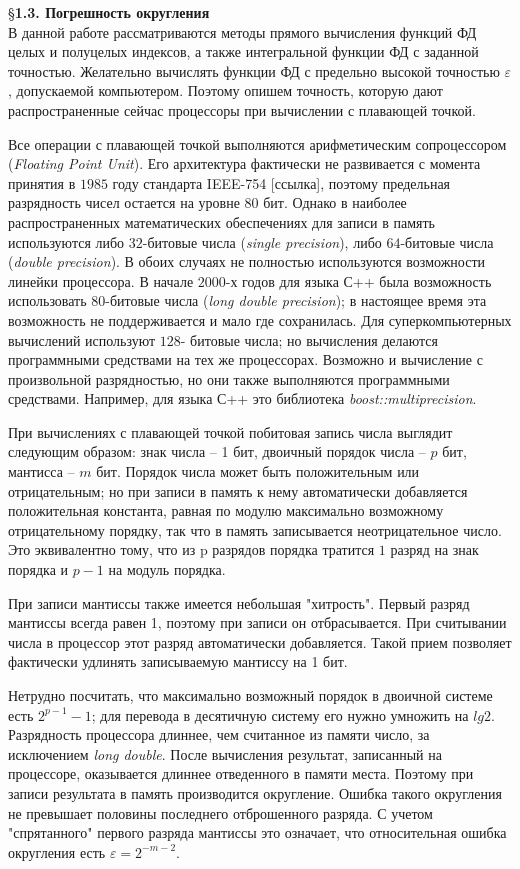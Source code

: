 \S \textbf{1.3. Погрешность округления}
\\

В данной работе рассматриваются методы прямого вычисления функций
ФД целых и полуцелых индексов, а также интегральной функции ФД с
заданной точностью. Желательно вычислять функции ФД с предельно высокой
точностью $\varepsilon$, допускаемой компьютером. Поэтому опишем точность, которую
дают распространенные сейчас процессоры при вычислении с плавающей
точкой.

Все операции с плавающей точкой
выполняются арифметическим сопроцессором (\textit{Floating Point Unit}). Его
архитектура фактически не развивается с момента принятия в $1985$ году
стандарта IEEE-754 [ссылка], поэтому предельная разрядность чисел остается на
уровне $80$ бит. Однако в наиболее распространенных математических
обеспечениях для записи в память используются либо $32$-битовые числа (\textit{single
precision}), либо $64$-битовые числа (\textit{double precision}). В обоих случаях не
полностью используются возможности линейки процессора. В начале $2000$-х
годов для языка С++ была возможность использовать $80$-битовые числа (\textit{long
double precision}); в настоящее время эта возможность не поддерживается и мало
где сохранилась. Для суперкомпьютерных вычислений используют $128$-
битовые числа; но вычисления делаются программными средствами на тех же
процессорах. Возможно и вычисление с произвольной разрядностью, но они
также выполняются программными средствами. Например, для языка С++ это
библиотека \textit{boost::multiprecision}.

При вычислениях с плавающей точкой побитовая запись числа выглядит
следующим образом: знак числа – 1 бит, двоичный порядок числа – $p$ бит,
мантисса – $m$ бит. Порядок числа может быть положительным или
отрицательным; но при записи в память к нему автоматически добавляется
положительная константа, равная по модулю максимально возможному
отрицательному порядку, так что в память записывается неотрицательное
число. Это эквивалентно тому, что из p разрядов порядка тратится $1$ разряд на
знак порядка и $p-1$ на модуль порядка.

При записи мантиссы также имеется небольшая "хитрость". Первый
разряд мантиссы всегда равен 1, поэтому при записи он отбрасывается. При
считывании числа в процессор этот разряд автоматически добавляется. Такой
прием позволяет фактически удлинять записываемую мантиссу на 1 бит.

Нетрудно посчитать, что максимально возможный порядок в двоичной
системе есть $2^{p-1} - 1$; для перевода в десятичную систему его нужно умножить
на $lg2$. Разрядность процессора длиннее, чем считанное из памяти число, за
исключением \textit{long double}. После вычисления результат, записанный на
процессоре, оказывается длиннее отведенного в памяти места. Поэтому при
записи результата в память производится округление. Ошибка такого
округления не превышает половины последнего отброшенного разряда. С
учетом "спрятанного" первого разряда мантиссы это означает, что
относительная ошибка округления есть $\varepsilon = 2^{-m-2}$.


